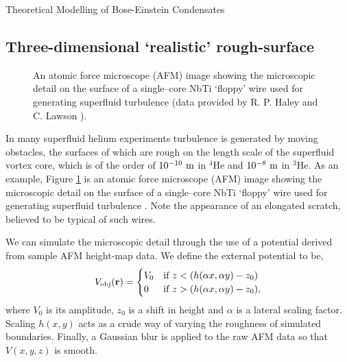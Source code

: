\begin{chapter}{\label{cha:theoretical_model}Theoretical Modelling of Bose-Einstein Condensates}
\subsection{\label{section:3dafmpotential} Three-dimensional `realistic' rough-surface}
\begin{figure}
	\centering
  \caption{An atomic force microscope (AFM) image showing the microscopic detail on the surface of a  single--core NbTi `floppy' wire used for generating superfluid turbulence (data provided by R. P. Haley and C. Lawson \cite{Lawson}).}\label{fig_afmprofile}
 \end{figure}

In many superfluid helium experiments \cite{VinenSkrbek2008} turbulence is generated by moving obstacles, the surfaces of which are rough on the length scale of the superfluid vortex core, which is of
the order of $10^{-10}~\rm m$ in $^4$He
and $10^{-8}~\rm m$ in $^3$He.  As an example, Figure \ref{fig_afmprofile} is an atomic force microscope (AFM) image showing the microscopic detail on the surface of a  single--core NbTi `floppy' wire used for generating superfluid turbulence  \cite{Bradley2011}.  Note the appearance of an elongated scratch, believed to be typical of such wires.

We can simulate the microscopic detail through the use of a potential derived from sample AFM height-map data. We define the external potential to be,
\begin{equation}
V_{\mathrm{obj}}({\bf r}) =
\begin{cases}
V_0 &\mbox{if } z < (h(\alpha x,\alpha y)-z_0)  \\
0 &\mbox{if } z > (h(\alpha x,\alpha y)-z_0),
\end{cases}
\label{eq:potentialAFM3D}
\end{equation}
where $V_0$ is its amplitude, $z_0$ is a shift in height and $\alpha$ is a lateral scaling factor. Scaling $h(x,y)$ acts as a crude way of varying the roughness of simulated boundaries. Finally, a Gaussian blur is applied to the raw AFM data so that $V(x,y,z)$ is smooth.

\end{chapter}
